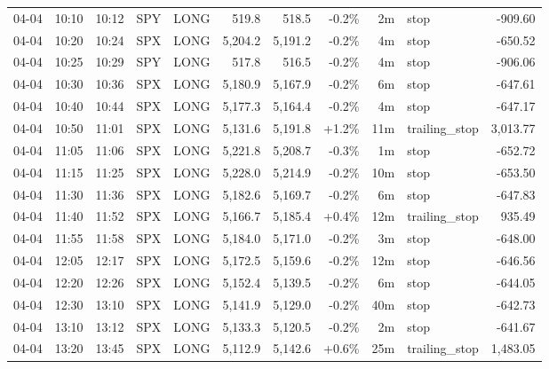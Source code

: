 \documentclass[11pt,a4paper,twoside]{article}
\begin{document}
\begin{center}
\begin{longtable}{>{\color{txtmain}}l l l l l r r r r >{\color{txtmain}}l r}
04-04 & 10:10 & 10:12 & SPY & LONG & 519.8 & 518.5 & \textcolor{lossred}{-0.2\%} & 2m & stop & \textcolor{lossred}{-909.60} \\
04-04 & 10:20 & 10:24 & SPX & LONG & 5,204.2 & 5,191.2 & \textcolor{lossred}{-0.2\%} & 4m & stop & \textcolor{lossred}{-650.52} \\
04-04 & 10:25 & 10:29 & SPY & LONG & 517.8 & 516.5 & \textcolor{lossred}{-0.2\%} & 4m & stop & \textcolor{lossred}{-906.06} \\
04-04 & 10:30 & 10:36 & SPX & LONG & 5,180.9 & 5,167.9 & \textcolor{lossred}{-0.2\%} & 6m & stop & \textcolor{lossred}{-647.61} \\
04-04 & 10:40 & 10:44 & SPX & LONG & 5,177.3 & 5,164.4 & \textcolor{lossred}{-0.2\%} & 4m & stop & \textcolor{lossred}{-647.17} \\
04-04 & 10:50 & 11:01 & SPX & LONG & 5,131.6 & 5,191.8 & \textcolor{wingreen}{+1.2\%} & 11m & trailing\_stop & \textcolor{wingreen}{3,013.77} \\
04-04 & 11:05 & 11:06 & SPX & LONG & 5,221.8 & 5,208.7 & \textcolor{lossred}{-0.3\%} & 1m & stop & \textcolor{lossred}{-652.72} \\
04-04 & 11:15 & 11:25 & SPX & LONG & 5,228.0 & 5,214.9 & \textcolor{lossred}{-0.2\%} & 10m & stop & \textcolor{lossred}{-653.50} \\
04-04 & 11:30 & 11:36 & SPX & LONG & 5,182.6 & 5,169.7 & \textcolor{lossred}{-0.2\%} & 6m & stop & \textcolor{lossred}{-647.83} \\
04-04 & 11:40 & 11:52 & SPX & LONG & 5,166.7 & 5,185.4 & \textcolor{wingreen}{+0.4\%} & 12m & trailing\_stop & \textcolor{wingreen}{935.49} \\
04-04 & 11:55 & 11:58 & SPX & LONG & 5,184.0 & 5,171.0 & \textcolor{lossred}{-0.2\%} & 3m & stop & \textcolor{lossred}{-648.00} \\
04-04 & 12:05 & 12:17 & SPX & LONG & 5,172.5 & 5,159.6 & \textcolor{lossred}{-0.2\%} & 12m & stop & \textcolor{lossred}{-646.56} \\
04-04 & 12:20 & 12:26 & SPX & LONG & 5,152.4 & 5,139.5 & \textcolor{lossred}{-0.2\%} & 6m & stop & \textcolor{lossred}{-644.05} \\
04-04 & 12:30 & 13:10 & SPX & LONG & 5,141.9 & 5,129.0 & \textcolor{lossred}{-0.2\%} & 40m & stop & \textcolor{lossred}{-642.73} \\
04-04 & 13:10 & 13:12 & SPX & LONG & 5,133.3 & 5,120.5 & \textcolor{lossred}{-0.2\%} & 2m & stop & \textcolor{lossred}{-641.67} \\
04-04 & 13:20 & 13:45 & SPX & LONG & 5,112.9 & 5,142.6 & \textcolor{wingreen}{+0.6\%} & 25m & trailing\_stop & \textcolor{wingreen}{1,483.05} \\

\end{longtable}
\end{center}
\end{document}

